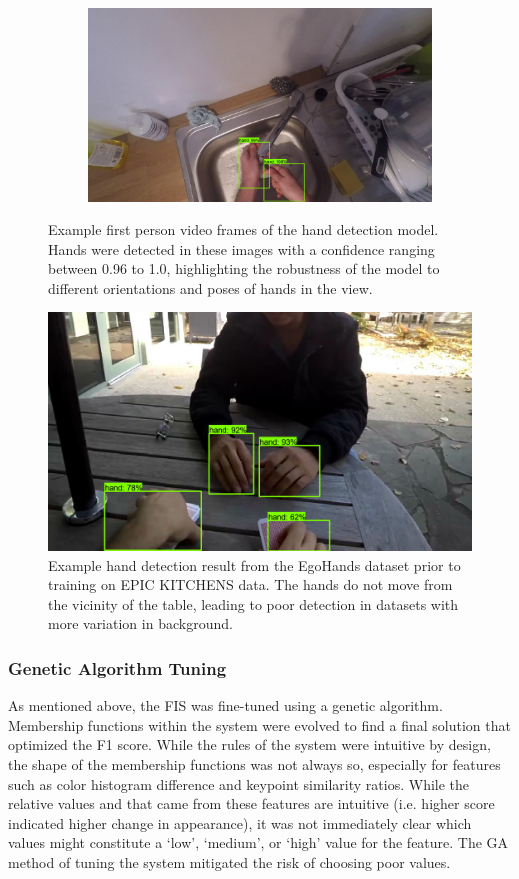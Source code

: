 \documentclass[12pt]{report}
\begin{document}
\begin{figure}[t]
\begin{subfigure}{.5\textwidth}
\label{handsC}
\end{subfigure}
\begin{subfigure}{.5\textwidth}
\centerline{\includegraphics[width=.95\linewidth]{figure/handEval4.png}}
\label{handsD}
\end{subfigure}
\caption{Example first person video frames of the hand detection model. Hands were detected in these images with a confidence ranging between 0.96 to 1.0, highlighting the robustness of the model to different orientations and poses of hands in the view.}
\label{sampleHands}
\end{figure}

\begin{figure}[t]
\centerline{\includegraphics[width=.65\linewidth]{figure/egoHands1.png}}
\caption{Example hand detection result from the EgoHands dataset prior to training on EPIC KITCHENS data. The hands do not move from the vicinity of the table, leading to poor detection in datasets with more variation in background.}
\label{sampleEgoHands}
\end{figure}

\subsubsection{Genetic Algorithm Tuning}
As mentioned above, the FIS was fine-tuned using a genetic algorithm. Membership functions within the system were evolved to find a final solution that optimized the F1 score. While the rules of the system were intuitive by design, the shape of the membership functions was not always so, especially for features such as color histogram difference and keypoint similarity ratios. While the relative values and that came from these features are intuitive (i.e. higher score indicated higher change in appearance), it was not immediately clear which values might constitute a `low', `medium', or `high' value for the feature. The GA method of tuning the system mitigated the risk of choosing poor values.
\end{document}
